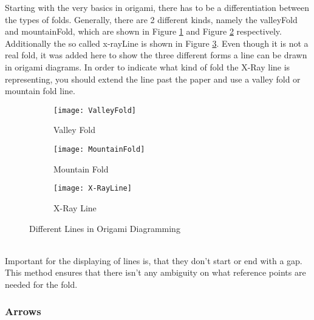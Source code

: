 Starting with the very basics in origami, there has to be a differentiation between the types of folds. Generally, there are 2 different kinds, namely the \gls{valleyFold} and \gls{mountainFold}, which are shown in Figure \ref{fig:valleyFold} and Figure \ref{fig:mountainFold} respectively. Additionally the so called \gls{x-rayLine} is shown in Figure \ref{fig:x-rayLine}. Even though it is not a real fold, it was added here to show the three different forms a line can be drawn in origami diagrams. In order to indicate what kind of fold the X-Ray line is representing, you should extend the line past the paper and use a valley fold or mountain fold line.
\begin{figure*}[htbp]
    \centering
    \begin{subfigure}{0.3\textwidth}
        \texttt{[image: ValleyFold]}
        \caption{Valley Fold}
        \label{fig:valleyFold}
    \end{subfigure}
    \begin{subfigure}{0.3\textwidth}
        \texttt{[image: MountainFold]}
        \caption{Mountain Fold}
        \label{fig:mountainFold}
    \end{subfigure}
    \begin{subfigure}{0.3\textwidth}
        \texttt{[image: X-RayLine]}
        \caption{X-Ray Line}
        \label{fig:x-rayLine}
    \end{subfigure}
    \caption{Different Lines in Origami Diagramming}\label{fig:origamiLines}
\end{figure*}
\\
Important for the displaying of lines is, that they don't start or end with a gap. This method ensures that there isn't any ambiguity on what reference points are needed for the fold.

\subsubsection{Arrows}
\label{sec:arrows}

